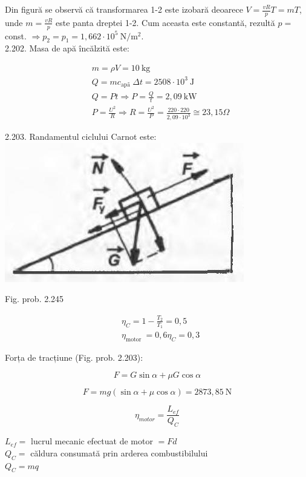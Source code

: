 \documentclass[10pt]{article}
\begin{document}
Din figură se observă că transformarea 1-2 este izobară deoarece $V=\frac{v R}{p} T=m T$, unde $m=\frac{v R}{p}$ este panta dreptei 1-2. Cum aceasta este constantă, rezultă $p=$ const. $\Rightarrow p_{2}=p_{1}=1,662 \cdot 10^{5} \mathrm{~N} / \mathrm{m}^{2}$.\\
2.202. Masa de apă încălzită este:

$$
\begin{aligned}
& m=\rho V=10 \mathrm{~kg} \\
& Q=m c_{\text {apã }} \Delta t=2508 \cdot 10^{3} \mathrm{~J} \\
& Q=P t \Rightarrow P=\frac{Q}{t}=2,09 \mathrm{~kW} \\
& P=\frac{U^{2}}{R} \Rightarrow R=\frac{U^{2}}{P}=\frac{220 \cdot 220}{2,09 \cdot 10^{3}} \cong 23,15 \Omega
\end{aligned}
$$

2.203. Randamentul ciclului Carnot este:\\
\includegraphics[max width=\textwidth, center]{2025_07_01_5b3ff9fa0d508c8e9f17g-314}

Fig. prob. 2.245

$$
\begin{aligned}
& \eta_{C}=1-\frac{T_{2}}{T_{1}}=0,5 \\
& \eta_{\text {motor }}=0,6 \eta_{C}=0,3
\end{aligned}
$$

Forța de tracțiune (Fig. prob. 2.203):

$$
F=G \sin \alpha+\mu G \cos \alpha
$$

$$
F=m g(\sin \alpha+\mu \cos \alpha)=2873,85 \mathrm{~N}
$$

$$
\eta_{m o t o r}=\frac{L_{e f}}{Q_{C}}
$$

$L_{e f}=$ lucrul mecanic efectuat de motor $=F d$\\
$Q_{C}=$ căldura consumată prin arderea combustibilului\\
$Q_{C}=m q$
\end{document}
